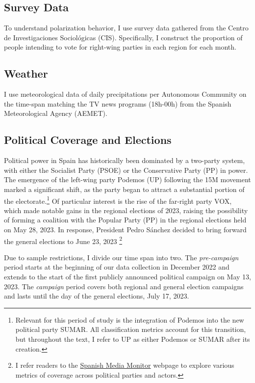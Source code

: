 \documentclass[12pt]{article}
\begin{document}
	\subsection*{Survey Data}
	
	To understand polarization behavior, I use survey data gathered from the Centro de Investigaciones Sociológicas (CIS). Specifically, I construct the proportion of people intending to vote for right-wing parties in each region  for each month.
	
	\subsection*{Weather}
	
	I use meteorological data of daily precipitations per Autonomous Community on the time-span matching the TV news programs (18h-00h) from the Spanish Meteorological Agency (AEMET).
	
	
	\subsection{Political Coverage and Elections}
	
	Political power in Spain has historically been dominated by a two-party system, with either the Socialist Party (PSOE) or the Conservative Party (PP) in power. The emergence of the left-wing party Podemos (UP) following the 15M movement marked a significant shift, as the party began to attract a substantial portion of the electorate.\footnote{Relevant for this period of study is the integration of Podemos into the new political party SUMAR. All classification metrics account for this transition, but throughout the text, I refer to UP as either Podemos or SUMAR after its creation.} Of particular interest is the rise of the far-right party VOX, which made notable gains in the regional elections of 2023, raising the possibility of forming a coalition with the Popular Party (PP) in the regional elections held on May 28, 2023. In response, President Pedro Sánchez decided to bring forward the general elections to June 23, 2023 \footnote{ I refer readers to the \href{https://luisignaciomenendez.github.io/media_monitor/index.html}{Spanish Media Monitor} webpage to explore various metrics of coverage across political parties and actors.} 
	
	
	Due to sample restrictions, I divide our time span into two. The \textit{pre-campaign} period starts at the beginning of our data collection in December 2022 and extends to the start of the first publicly announced political campaign on May 13, 2023. The \textit{campaign} period covers both regional and general election campaigns and lasts until the day of the general elections, July 17, 2023.
	
\end{document}
